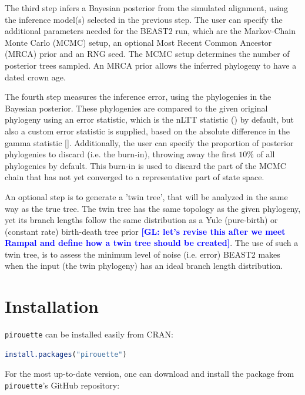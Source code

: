 \documentclass{article}
\newcommand{\giovanni}[1]{\textcolor{blue}{\textbf{[GL: #1]}}}
\begin{document}
The third step infers a Bayesian posterior from the simulated alignment,
using the inference model(s) selected in the previous step. The user
can specify the additional parameters needed for the BEAST2 run, which
are the Markov-Chain Monte Carlo (MCMC) setup, 
an optional Most Recent Common Ancestor (MRCA) prior and an RNG seed.
The MCMC setup determines the number of posterior trees sampled.
An MRCA prior allows the inferred phylogeny to have a dated crown age.

The fourth step measures the inference error, using the phylogenies in the
Bayesian posterior. These phylogenies are compared to the given
original phylogeny using an error statistic, which is the nLTT 
statistic (\cite{janzen2015approximate}) by default,
but also a custom error statistic is supplied, based
on the absolute difference in the gamma statistic [\cite{pybus2000testing}]. 
Additionally, the user can specify the
proportion of posterior phylogenies to 
discard (i.e. the burn-in), throwing away the first $10\%$
of all phylogenies by default. This burn-in is used to discard
the part of the MCMC chain that has not yet converged to a
representative part of state space.

An optional step is to generate a 'twin tree', that will be
analyzed in the same way as the true tree. The twin tree has the same
topology as the given phylogeny, yet its branch lengths follow the same
distribution as a Yule (pure-birth) or (constant rate) birth-death tree prior \giovanni{let's revise this after we meet Rampal and define how a twin tree should be created}.
The use of such a twin tree, is to assess the minimum level of noise (i.e. 
error) BEAST2 makes when the input (the twin phylogeny) has an ideal branch
length distribution.

\section{Installation}

\verb;pirouette; can be installed easily from CRAN:

\begin{lstlisting}[language=R, floatplacement=H, frame=single]
install.packages("pirouette")
\end{lstlisting}

For the most up-to-date version, 
one can download and install the package from \verb;pirouette;'s GitHub repository:
\end{document}
